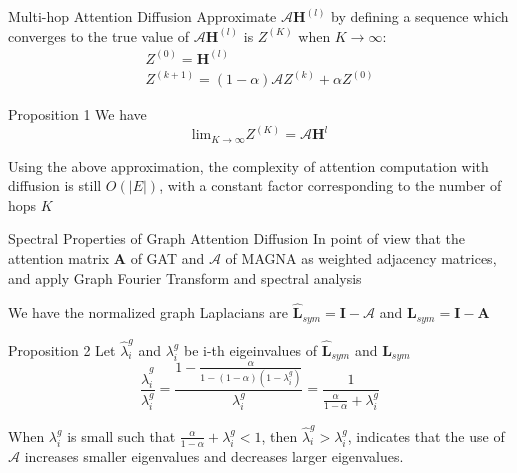 \documentclass[notheorems, aspectratio=149]{beamer}
\begin{document}
		\begin{frame}{Multi-hop Attention Diffusion}
			Approximate $\mathcal{A}\mathbf{H}^{(l)}$ by defining a sequence which converges to the true value of $\mathcal{A}\mathbf{H}^{(l)}$ is $Z^{(K)}$ when $K \rightarrow \infty$: 
			\begin{gather}
				Z^{(0)} = \mathbf{H}^{(l)} \\
				Z^{(k+1)} = (1-\alpha)\mathcal{A}Z^{(k)} + \alpha Z^{(0)}
			\end{gather}
			\begin{block}{Proposition 1}
				We have
				\begin{equation}
					\text{lim}_{K \rightarrow \infty}Z^{(K)} = \mathcal{A}\mathbf{H}^l
				\end{equation}
			\end{block}
			Using the above approximation, the complexity of attention computation with diffusion is still $O(|E|)$, with a constant factor corresponding to the number of hops $K$
		\end{frame}
		\begin{frame}{Spectral Properties of Graph Attention Diffusion}
			In point of view that the attention matrix $\mathbf{A}$ of GAT and $\mathcal{A}$ of MAGNA as weighted adjacency matrices, and apply Graph Fourier Transform and spectral analysis
			
			We have the normalized graph Laplacians are $\hat{\mathbf{L}}_{sym} = \mathbf{I} - \mathcal{A}$ and $\mathbf{L}_{sym} = \mathbf{I} - \mathbf{A}$
			\begin{block}{Proposition 2}
				Let $\hat{\lambda}_i^g$ and $\lambda_i^g$ be i-th eigeinvalues of $\hat{\mathbf{L}}_{sym}$ and $\mathbf{L}_{sym}$
				\begin{equation}
					\frac{\hat{\lambda}_i^g}{\lambda_i^g} = \frac{1-\frac{\alpha}{1-(1-\alpha)(1-\lambda_i^g)}}{\lambda_i^g} = \frac{1}{\frac{\alpha}{1-\alpha}+\lambda_i^g}
				\end{equation}
			\end{block}
			When $\lambda_i^g$ is small such that $\frac{\alpha}{1-\alpha}+\lambda_i^g < 1$, then $\hat{\lambda}_i^g > \lambda_i^g$, indicates that the
			use of $\mathcal{A}$ increases smaller eigenvalues and decreases larger
			eigenvalues.
		\end{frame}
\end{document}
